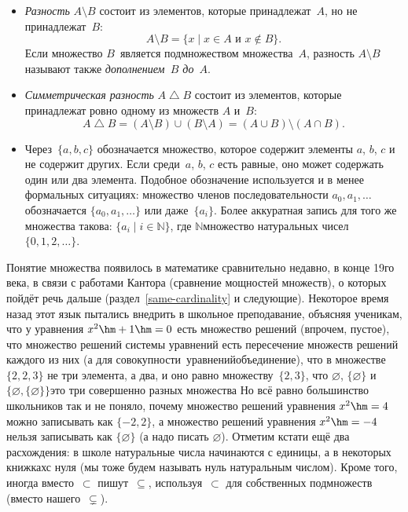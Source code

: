 \begin{itemize}
\item
\emph{Разность}
$A\setminus B$ состоит из элементов, которые принадлежат~$A$, но
не принадлежат~$B$:
        $$
A \setminus B = \{ x\mid x\in A \text{ и } x\notin B\}.
        $$
Если множество
$B$~является подмножеством
множества~$A$, разность $A\setminus B$
называют также \emph{дополнением~$B$ до~$A$}.

\item
\emph{Симметрическая разность}%
 $A\bigtriangleup B$%
\index{$\bigtriangleup$} состоит из
элементов, которые принадлежат ровно одному из множеств $A$
и~$B$:
        $$
A \bigtriangleup B =
 (A\setminus B)\cup (B\setminus A)=(A\cup B)\setminus (A\cap B).
        $$

\item
Через~$\{a,b,c\}$ обозначается множество, которое содержит
элементы $a$, $b$, $c$ и не содержит других. Если среди~$a$, $b$, $c$
есть равные,
оно может содержать один
или два элемента. Подобное
обозначение используется и в менее формальных ситуациях:
множество членов последовательности $a_0,a_1,\ldots$ обозначается
$\{a_0,a_1,\ldots\}$ или даже~$\{a_i\}$. Более аккуратная запись для
того же множества такова: $\{a_i\mid i\in\mathbb{N}\}$, где
$\mathbb{N}$\т множество натуральных чисел $\{0,1,2,\ldots\}$.

\end{itemize}

Понятие множества появилось в математике сравнительно недавно, в
конце 19\д го века, в связи с работами Кантора (сравнение
мощностей множеств), о которых пойдёт речь дальше
(раздел~\ref{same-cardinality} и следующие).
Некоторое время назад этот язык пытались внедрить в школьное преподавание,
объясняя ученикам, что у уравнения $x^2\hm+1\hm=0$ есть множество
решений (впрочем, пустое), что множество решений системы
уравнений есть пересечение множеств решений каждого из них (а
для  совокупности\ уравнений\т объединение), что в
множестве $\{2,2,3\}$ не три элемента, а два, и оно равно
множеству~$\{2,3\}$, что $\varnothing$, $\{\varnothing\}$ и
$\{\varnothing,\{\varnothing\}\}$\т это три совершенно разных
множества  Но всё равно большинство школьников так и не
поняло, почему множество решений уравнения $x^2\hm=4$ можно
записывать как $\{-2,2\}$, а множество решений уравнения
$x^2\hm=-4$ нельзя записывать как $\{\varnothing\}$ (а надо писать
$\varnothing$). Отметим кстати ещё два расхождения: в школе
натуральные числа начинаются с единицы, а в некоторых
книжках\т с нуля (мы тоже будем называть нуль натуральным
числом). Кроме того, иногда вместо~$\subset$
пишут~$\subseteq$\index{$\subseteq$},
используя~$\subset$ для собственных подмножеств (вместо
нашего~$\subsetneq$).

